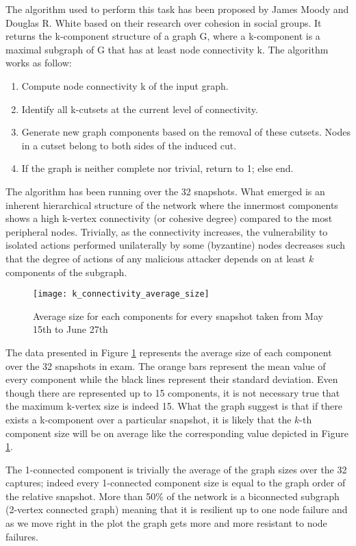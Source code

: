 	The algorithm used to perform this task has been proposed by James Moody and Douglas R. White \cite{Moody2003} based on their research over cohesion in social groups. It returns the k-component structure of a graph G, where a k-component is a maximal subgraph of G that has at least node connectivity k. The algorithm works as follow:
	\begin{enumerate}
		\item Compute node connectivity k of the input graph.
		\item Identify all k-cutsets at the current level of connectivity. 
		\item Generate new graph components based on the removal of these cutsets. Nodes in a cutset belong to both sides of the induced cut.
		\item If the graph is neither complete nor trivial, return to 1; else end.
	\end{enumerate}
	
	The algorithm has been running over the 32 snapshots. What emerged is an inherent hierarchical structure of the network where the innermost components shows a high k-vertex connectivity (or cohesive degree) compared to the most peripheral nodes. Trivially, as the connectivity increases, the vulnerability to isolated actions performed unilaterally by some (byzantine) nodes decreases such that the degree of actions of any malicious attacker depends on at least $k$ components of the subgraph.
	
	\begin{figure}
		\texttt{[image: k\_connectivity\_average\_size]}\\
		\caption{Average size for each components for every snapshot taken from May 15th to June 27th}
		\label{monthly_connectivity_average}
	\end{figure}
	
	The data presented in Figure \ref{monthly_connectivity_average} represents the average size of each component over the 32 snapshots in exam. The orange bars represent the mean value of every component while the black lines represent their standard deviation. Even though there are represented up to 15 components, it is not necessary true that the maximum k-vertex size is indeed 15. What the graph suggest is that if there exists a k-component over a particular snapshot, it is likely that the $k$-th component size will be on average like the corresponding value depicted in Figure \ref{monthly_connectivity_average}.
	
	The 1-connected component is trivially the average of the graph sizes over the 32 captures; indeed every 1-connected component size is equal to the graph order of the relative snapshot. More than 50\% of the network is a biconnected subgraph (2-vertex connected graph) meaning that it is resilient up to one node failure and as we move right in the plot the graph gets more and more resistant to node failures. 
	
